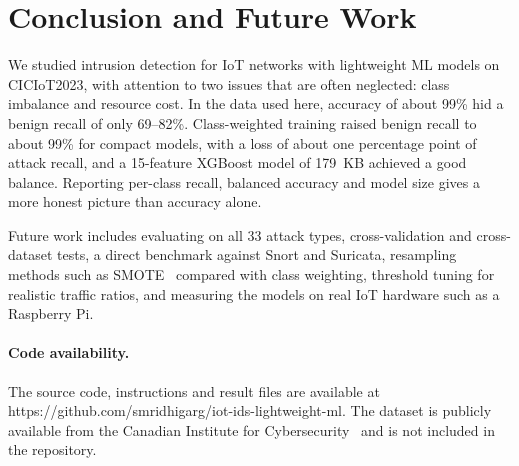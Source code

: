 \documentclass[runningheads]{llncs}
\begin{document}
\section{Conclusion and Future Work}
\label{sec:conclusion}

We studied intrusion detection for IoT networks with lightweight ML models on CICIoT2023, with attention to two issues that are often neglected: class imbalance and resource cost. In the data used here, accuracy of about 99\% hid a benign recall of only 69--82\%. Class-weighted training raised benign recall to about 99\% for compact models, with a loss of about one percentage point of attack recall, and a 15-feature XGBoost model of 179~KB achieved a good balance. Reporting per-class recall, balanced accuracy and model size gives a more honest picture than accuracy alone.

Future work includes evaluating on all 33 attack types, cross-validation and cross-dataset tests, a direct benchmark against Snort and Suricata, resampling methods such as SMOTE~\cite{chawla2002} compared with class weighting, threshold tuning for realistic traffic ratios, and measuring the models on real IoT hardware such as a Raspberry Pi.

\paragraph{Code availability.} The source code, instructions and result files are available at https://github.com/smridhigarg/iot-ids-lightweight-ml. The dataset is publicly available from the Canadian Institute for Cybersecurity~\cite{cic} and is not included in the repository.
\end{document}
